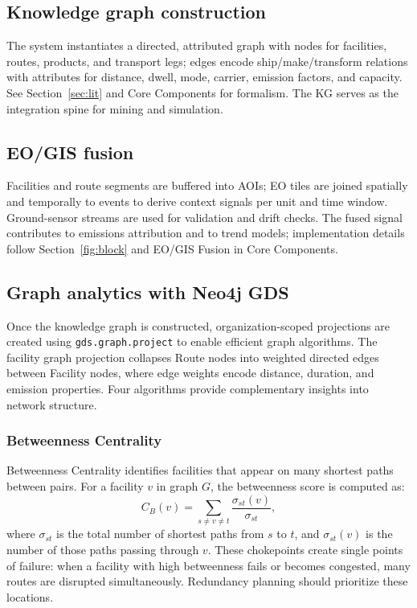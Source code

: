 \documentclass[conference]{IEEEtran}
\begin{document}
\subsection{Knowledge graph construction}
The system instantiates a directed, attributed graph with nodes for facilities, routes, products, and transport legs; edges encode ship/make/transform relations with attributes for distance, dwell, mode, carrier, emission factors, and capacity. See Section~\ref{sec:lit} and Core Components for formalism. The KG serves as the integration spine for mining and simulation.

\subsection{EO/GIS fusion}
Facilities and route segments are buffered into AOIs; EO tiles are joined spatially and temporally to events to derive context signals per unit and time window. Ground-sensor streams are used for validation and drift checks. The fused signal contributes to emissions attribution and to trend models; implementation details follow Section~\ref{fig:block} and EO/GIS Fusion in Core Components.

\subsection{Graph analytics with Neo4j GDS}
Once the knowledge graph is constructed, organization-scoped projections are created using \texttt{gds.graph.project} to enable efficient graph algorithms. The facility graph projection collapses Route nodes into weighted directed edges between Facility nodes, where edge weights encode distance, duration, and emission properties. Four algorithms provide complementary insights into network structure.

\subsubsection{Betweenness Centrality}
Betweenness Centrality identifies facilities that appear on many shortest paths between pairs. For a facility $v$ in graph $G$, the betweenness score is computed as:
\begin{equation}
C_B(v) = \sum_{s \neq v \neq t} \frac{\sigma_{st}(v)}{\sigma_{st}},
\end{equation}
where $\sigma_{st}$ is the total number of shortest paths from $s$ to $t$, and $\sigma_{st}(v)$ is the number of those paths passing through $v$. These chokepoints create single points of failure: when a facility with high betweenness fails or becomes congested, many routes are disrupted simultaneously. Redundancy planning should prioritize these locations.
\end{document}
